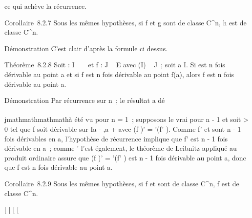 ce qui achève la récurrence.

Corollaire~8.2.7 Sous les mêmes hypothèses, si f et g sont de classe
C^n, h est de classe C^n.

Démonstration C'est clair d'après la formule ci dessus.

Théorème~8.2.8 Soit \phi : I \rightarrow~ ~ et f : J \rightarrow~ E avec \phi(I) \subset~ J~; soit a \in I.
Si \phi est n fois dérivable au point a et si f est n fois dérivable au
point f(a), alors f \cdot \phi est n fois dérivable au point a.

Démonstration Par récurrence sur n~; le résultat a dé\\\\jmathmathmathmathà été vu pour n =
1~; supposons le vrai pour n - 1 et soit \eta \textgreater{} 0 tel que f \cdot
\phi soit dérivable sur I\bigcap{]}a - \eta,a + \eta{[} avec (f \cdot \phi)' = \phi'(f' \cdot \phi).
Comme f' et \phi sont n - 1 fois dérivables en a, l'hypothèse de récurrence
implique que f' \cdot \phi est n - 1 fois dérivable en a~; comme \phi' l'est
également, le théorème de Leibnitz appliqué au produit ordinaire assure
que (f \cdot \phi)' = \phi'(f' \cdot \phi) est n - 1 fois dérivable au point a, donc que
f \cdot \phi est n fois dérivable au point a.

Corollaire~8.2.9 Sous les mêmes hypothèses, si f et \phi sont de classe
C^n, f \cdot \phi est de classe C^n.

{[}
{[}
{[}
{[}
